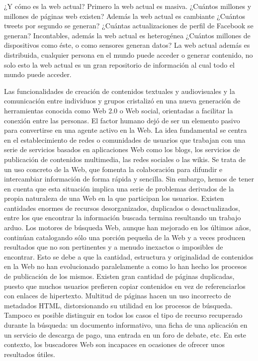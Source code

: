 
¿Y cómo es la web actual? Primero la web actual es masiva. ¿Cuántos millones y millones de páginas web existen? Además la web actual es cambiante ¿Cuántos tweets por segundo se generan? ¿Cuántas actualizaciones de perfil de Facebook se generan? Incontables, además la web actual es heterogénea ¿Cuántos millones de dispositivos como éste, o como sensores generan datos? La web actual además es distribuida, cualquier persona en el mundo puede acceder o generar contenido, no solo esto la web actual es un gran repositorio de información al cual todo el mundo puede acceder.

Las funcionalidades de creación de contenidos textuales y audiovisuales y la comunicación entre individuos y grupos cristalizó en una nueva generación de herramientas conocida como Web 2.0 o Web social, orientadas a facilitar la conexión entre las personas. El factor humano dejó de ser un elemento pasivo para convertirse en una agente activo en la Web. La idea fundamental se centra en el establecimiento de redes o comunidades de usuarios que trabajan con una serie de servicios basados en aplicaciones Web como los blogs, los servicios de publicación de contenidos multimedia, las redes sociales o las wikis. Se trata de un uso concreto de la Web, que fomenta la colaboración para difundir e intercambiar información de forma rápida y sencilla. Sin embargo, hemos de tener en cuenta que esta situación implica una serie de problemas derivados de la propia naturaleza de una Web en la que participan los usuarios. Existen cantidades enormes de recursos desorganizados, duplicados o desactualizados, entre los que encontrar la información buscada termina resultando un trabajo arduo. Los motores de búsqueda Web, aunque han mejorado en los últimos años, continúan catalogando sólo una porción pequeña de la Web y a veces producen resultados que no son pertinentes y a menudo inexactos o imposibles de encontrar. Esto se debe a que la cantidad, estructura y originalidad de contenidos en la Web no han evolucionado paralelamente a como lo han hecho los procesos de publicación de los mismos. Existen gran cantidad de páginas duplicadas, puesto que muchos usuarios prefieren copiar contenidos en vez de referenciarlos con enlaces de hipertexto. Multitud de páginas hacen un uso incorrecto de metadados HTML, distorsionando su utilidad en los procesos de búsqueda. Tampoco es posible distinguir en todos los casos el tipo de recurso recuperado durante la búsqueda: un documento informativo, una ficha de una aplicación en un servicio de descarga de pago, una entrada en un foro de debate, etc. En este contexto, los buscadores Web son incapaces en ocasiones de ofrecer unos resultados útiles. 

